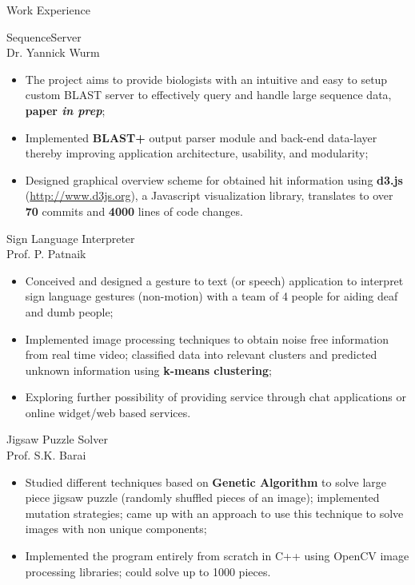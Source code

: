 \documentclass{article}
\newlength{\tabin}
\newlength{\secsep}
\newcommand{\lineunder}{\vspace*{-8pt} \\ \hspace*{-6pt} \hrulefill \\ \vspace*{-15pt}}
\newenvironment{tabbedsection}[1]{
  \begin{list}{}{
      \setlength{\itemsep}{0pt}
      \setlength{\labelsep}{0pt}
      \setlength{\labelwidth}{0pt}
      \setlength{\leftmargin}{\tabin}
      \setlength{\rightmargin}{\tabin}
      \setlength{\listparindent}{0pt}
      \setlength{\parsep}{0pt}
      \setlength{\parskip}{0pt}
      \setlength{\partopsep}{0pt}
      \setlength{\topsep}{#1}
    }
  \item[]
}{\end{list}}
\newenvironment{resume_section}[1]{
  \filbreak
  \vspace{2\secsep}
  \textsc{\large#1}
  \lineunder
  \begin{tabbedsection}{\secsep}
}{\end{tabbedsection}}
\newenvironment{resume_subsection}[2][]{
  \textbf{#2} \hfill {\footnotesize #1} \hspace*{-3.5em}
  \begin{tabbedsection}{0.5\secsep}
}{\end{tabbedsection}}
\newenvironment{subitems}{
  \renewcommand{\labelitemi}{$\cdot$}
  \begin{itemize}
      \setlength{\labelsep}{1em}
}{\end{itemize}}
\begin{document}
\begin{resume_section}  {Work Experience}
  \begin{resume_subsection}{SequenceServer \\ \footnotesize {Dr. Yannick Wurm}}
    \begin{subitems}
    \item The project aims to provide biologists with an intuitive and easy to setup custom BLAST server to effectively query and handle large sequence data, \textbf{paper \emph{in prep}};
      \item Implemented \textbf{BLAST+} output parser module and back-end data-layer thereby improving application architecture, usability, and modularity;
      \item Designed graphical overview scheme for obtained hit information using \textbf{d3.js} ({\footnotesize \url{http://www.d3js.org}}), a Javascript visualization library, translates to over \textbf{70} commits and \textbf{4000} lines of code changes. \\
    \end{subitems}
    \end{resume_subsection}

  \begin{resume_subsection}[Apr, 2014]{Sign Language Interpreter \\ \footnotesize {Prof. P. Patnaik}}
  \begin{subitems}
    \item Conceived and designed a gesture to text (or speech) application to interpret sign language gestures (non-motion) with a team of 4 people for aiding deaf and dumb people;
    \item Implemented image processing techniques to obtain noise free information from real time video; classified data into relevant clusters and predicted unknown information using \textbf{k-means clustering};
    \item Exploring further possibility of providing service through chat applications or online widget/web based services.\\
    \end{subitems}
  \end{resume_subsection}

  \begin{resume_subsection}[Mar, 2014]{Jigsaw Puzzle Solver \\ \footnotesize {Prof. S.K. Barai}}
    \begin{subitems}
    \item Studied different techniques based on \textbf{Genetic Algorithm} to solve large piece jigsaw puzzle (randomly shuffled pieces of an image); implemented mutation strategies; came up with an approach to use this technique to solve images with non unique components;
    \item Implemented the program entirely from scratch in C++ using OpenCV image processing libraries; could solve up to 1000 pieces.\\
    \end{subitems}
  \end{resume_subsection}


\end{resume_section}
\end{document}
